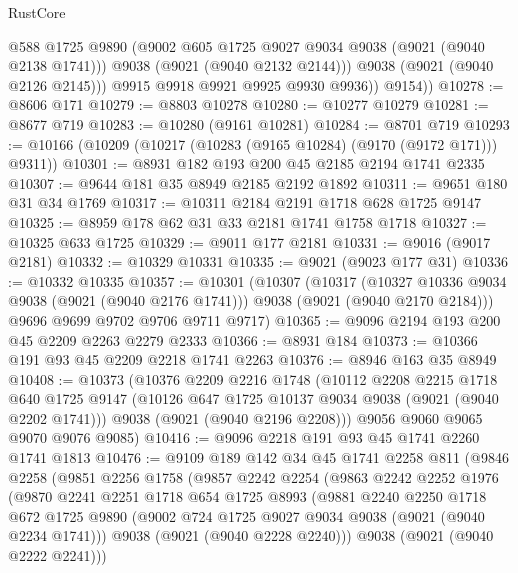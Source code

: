 \begin{lexlean}{RustCore}
\begin{coremodule}
                @588
                @1725
                @9890
                (@9002 @605 @1725 @9027 @9034 @9038 (@9021 (@9040 @2138 @1741)))
                @9038
                (@9021 (@9040 @2132 @2144)))
              @9038
              (@9021 (@9040 @2126 @2145)))
            @9915
            @9918
            @9921
            @9925
            @9930
            @9936))
        @9154))
@10278 := @8606 @171
@10279 := @8803 @10278
@10280 := @10277 @10279
@10281 := @8677 @719
@10283 := @10280 (@9161 @10281)
@10284 := @8701 @719
@10293 := @10166 (@10209 (@10217 (@10283 (@9165 @10284) (@9170 (@9172 @171))) @9311))
@10301 := @8931 @182 @193 @200 @45 @2185 @2194 @1741 @2335
@10307 := @9644 @181 @35 @8949 @2185 @2192 @1892
@10311 := @9651 @180 @31 @34 @1769
@10317 := @10311 @2184 @2191 @1718 @628 @1725 @9147
@10325 := @8959 @178 @62 @31 @33 @2181 @1741 @1758 @1718
@10327 := @10325 @633 @1725
@10329 := @9011 @177 @2181
@10331 := @9016 (@9017 @2181)
@10332 := @10329 @10331
@10335 := @9021 (@9023 @177 @31)
@10336 := @10332 @10335
@10357 := @10301
    (@10307
      (@10317
        (@10327 @10336 @9034 @9038 (@9021 (@9040 @2176 @1741)))
        @9038
        (@9021 (@9040 @2170 @2184)))
      @9696
      @9699
      @9702
      @9706
      @9711
      @9717)
@10365 := @9096 @2194 @193 @200 @45 @2209 @2263 @2279 @2333
@10366 := @8931 @184
@10373 := @10366 @191 @93 @45 @2209 @2218 @1741 @2263
@10376 := @8946 @163 @35 @8949
@10408 := @10373
    (@10376
      @2209
      @2216
      @1748
      (@10112
        @2208
        @2215
        @1718
        @640
        @1725
        @9147
        (@10126 @647 @1725 @10137 @9034 @9038 (@9021 (@9040 @2202 @1741)))
        @9038
        (@9021 (@9040 @2196 @2208)))
      @9056
      @9060
      @9065
      @9070
      @9076
      @9085)
@10416 := @9096 @2218 @191 @93 @45 @1741 @2260 @1741 @1813
@10476 := @9109
    @189
    @142
    @34
    @45
    @1741
    @2258
    @811
    (@9846
      @2258
      (@9851
        @2256
        @1758
        (@9857
          @2242
          @2254
          (@9863
            @2242
            @2252
            @1976
            (@9870
              @2241
              @2251
              @1718
              @654
              @1725
              @8993
              (@9881
                @2240
                @2250
                @1718
                @672
                @1725
                @9890
                (@9002 @724 @1725 @9027 @9034 @9038 (@9021 (@9040 @2234 @1741)))
                @9038
                (@9021 (@9040 @2228 @2240)))
              @9038
              (@9021 (@9040 @2222 @2241)))

\end{coremodule}
\end{lexlean}
